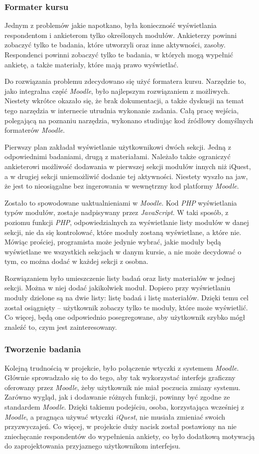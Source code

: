 \subsubsection{Formater kursu}
Jednym z problemów jakie napotkano, była konieczność wyświetlania respondentom i ankieterom tylko określonych modułów. Ankieterzy powinni zobaczyć tylko te badania, które utworzyli oraz inne aktywności, zasoby. Respondenci powinni zobaczyć tylko te badania, w których mogą wypełnić ankietę, a także materiały, które mają prawo wyświetlać.

Do rozwiązania problemu zdecydowano się użyć formatera kursu. Narzędzie to, jako integralna część \emph{Moodle}, było najlepszym rozwiązaniem z możliwych. Niestety wkrótce okazało się, że brak dokumentacji, a także dyskusji na temat tego narzędzia w internecie utrudnia wykonanie zadania. Całą pracę wejścia, polegającą na poznaniu narzędzia, wykonano studiując kod źródłowy domyślnych formaterów \emph{Moodle}.

Pierwszy plan zakładał wyświetlanie użytkownikowi dwóch sekcji. Jedną z odpowiednimi badaniami, drugą z materiałami. Należało także ograniczyć ankieterowi możliwość dodawania w pierwszej sekcji modułów innych niż iQuest, a w drugiej sekcji uniemożliwić dodanie tej aktywności. Niestety wyszło na jaw, że jest to nieosiągalne bez ingerowania w wewnętrzny kod platformy \emph{Moodle}. 

Zostało to spowodowane uaktualnieniami w \emph{Moodle}. Kod \emph{PHP} wyświetlania typów modułów, zostaje nadpisywany przez \emph{JavaScript}. W taki sposób, z poziomu funkcji \emph{PHP}, odpowiedzialnych za wyświetlanie listy modułów w danej sekcji, nie da się kontrolować, które moduły zostaną wyświetlane, a które nie. Mówiąc prościej, programista może jedynie wybrać, jakie moduły będą wyświetlane we wszystkich sekcjach w danym kursie, a nie może decydować o tym, co można dodać w każdej sekcji z osobna.

Rozwiązaniem było umieszczenie listy badań oraz listy materiałów w jednej sekcji. Można w niej dodać jakikolwiek moduł. Dopiero przy wyświetlaniu moduły dzielone są na dwie listy: listę badań i listę materiałów. Dzięki temu cel został osiągnięty -- użytkownik zobaczy tylko te moduły, które może wyświetlić. Co więcej, będą one odpowiednio posegregowane, aby użytkownik szybko mógł znaleźć to, czym jest zainteresowany.

\subsubsection{Tworzenie badania}
Kolejną trudnością w projekcie, było połączenie wtyczki z systemem \emph{Moodle}. Głównie sprowadzało się to do tego, aby tak wykorzystać interfejs graficzny oferowany przez \emph{Moodle}, żeby użytkownik nie miał poczucia zmiany systemu. Zarówno wygląd, jak i dodawanie różnych funkcji, powinny być zgodne ze standardem \emph{Moodle}. Dzięki takiemu podejściu, osoba, korzystająca wcześniej z \emph{Moodle}, a pragnąca używać wtyczki \emph{iQuest}, nie musiała zmieniać swoich przyzwyczajeń. Co więcej, w projekcie duży nacisk został postawiony na nie zniechęcanie respondentów do wypełnienia ankiety, co było dodatkową motywacją do zaprojektowania przyjaznego użytkownikom interfejsu.

